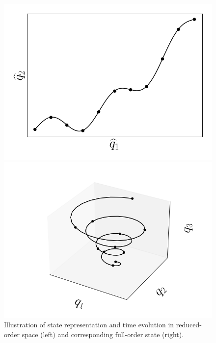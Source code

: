 \begin{figure}
	\begin{minipage}{0.49\linewidth}
		\includegraphics[width=0.99\linewidth]{Chapters/Overview/Images/mapExample_2d.png}
	\end{minipage}
	\begin{minipage}{0.49\linewidth}
		\includegraphics[width=0.99\linewidth,trim={3em 1.5em 3em 4em},clip]{Chapters/Overview/Images/mapExample_3d.png}
	\end{minipage}
	\caption{\label{fig:mappingVis}Illustration of state representation and time evolution in reduced-order space (left) and corresponding full-order state (right).}
\end{figure}

